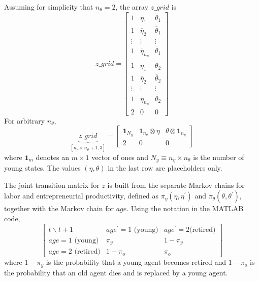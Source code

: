 \documentclass[11pt,fleqn]{article}
\begin{document}
Assuming for simplicity that $n_{\theta }=2$, the array $z\_grid$ is
\begin{equation*}
	z\_grid=%
	\begin{bmatrix}
		1 & \overline{\eta }_{1} & \overline{\theta }_{1} \\ 
		1 & \overline{\eta }_{2} & \overline{\theta }_{1} \\ 
		\vdots  & \vdots  & \vdots  \\ 
		1 & \overline{\eta }_{n_{\eta }} & \overline{\theta }_{1} \\ 
		1 & \overline{\eta }_{1} & \overline{\theta }_{2} \\ 
		1 & \overline{\eta }_{2} & \overline{\theta }_{2} \\ 
		\vdots  & \vdots  & \vdots  \\ 
		1 & \overline{\eta }_{n_{\eta }} & \overline{\theta }_{2} \\ 
		2 & 0 & 0%
	\end{bmatrix}%
\end{equation*}%
For arbitrary $n_{\theta }$,
\begin{equation*}
	\underbrace{z\_grid}_{[n_{\eta}\times n_{\theta}+1,3]}=%
	\begin{bmatrix}
		\mathbf{1}_{N_y} & \mathbf{1}_{n_{\theta }}\otimes \eta  & \theta \otimes \mathbf{1}_{n_{\eta }}
		\\ 
		2 & 0 & 0%
	\end{bmatrix}%
\end{equation*}%
where $\mathbf{1}_{m}$ denotes an $m\times 1$ vector of ones and $N_y \equiv n_{\eta} \times n_{\theta}$ is the number of young states. The values $(\eta,\theta)$ in the last row are placeholders only.

The joint transition matrix for $z$ is built from the separate Markov chains for labor and entrepreneurial productivity, defined as $\pi_{\eta }(\eta ,\eta ^{\prime })$ and $\pi_{\theta}(\theta ,\theta ^{\prime })$, together with the Markov chain for $age$. Using the notation in the MATLAB code,
\begin{equation*}
	\begin{bmatrix}
		t\backslash t+1 & age^{\prime }=1\text{ (young)} & age^{\prime }=2\text{
			(retired)} \\ 
		age=1\text{ (young)} & \pi_y & 1-\pi_y \\ 
		age=2\text{ (retired)} & 1-\pi_o & \pi_o%
	\end{bmatrix}%
\end{equation*}%
where $1-\pi_y$ is the probability that a young agent becomes retired and $1-\pi_o$ is the probability that an old agent dies and is replaced by a young agent.
\end{document}
